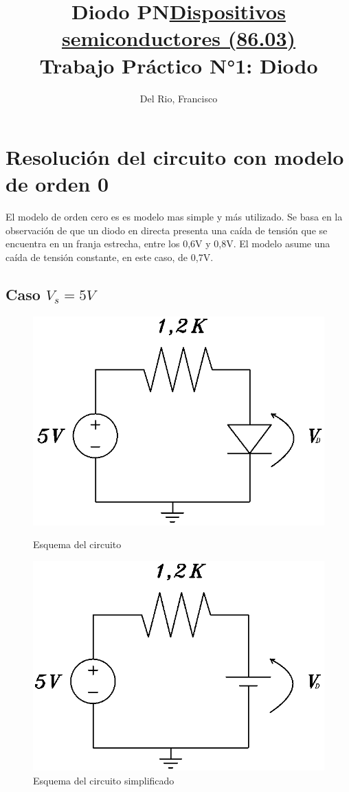 \documentclass[10pt]{article}
\title{Diodo PN}	            %
\author{Del Rio, Francisco}
\begin{document}
\title{\textbf{\underline{Dispositivos semiconductores (86.03)} \\
Trabajo Práctico N°1: Diodo}}

\section{Resolución del circuito con modelo de orden 0}
\quad El modelo de orden cero es es modelo mas simple y más utilizado. Se basa en la observación de que un diodo en directa presenta una caída de tensión que se encuentra en un franja estrecha, entre los 0,6V y 0,8V. El modelo asume una caída de tensión constante, en este caso, de 0,7V.
\subsection{Caso $V_s = 5V$}
\begin{figure}[ht!]
\begin{minipage}{.5\textwidth}
\centering
\includegraphics[width=0.6\linewidth]{resources/circuito_diodo_5v.png}
\caption{Esquema del circuito}
\label{fig:circuito_diodo_5v}
\end{minipage}
\begin{minipage}{.5\textwidth}
\centering
\includegraphics[width=0.6\linewidth]{resources/circuito_diodo_5v_simplificado.png}
\caption{Esquema del circuito simplificado}
\label{fig:circuito_diodo_5v_simplificado}
\end{minipage}
\end{figure}
\end{document}
